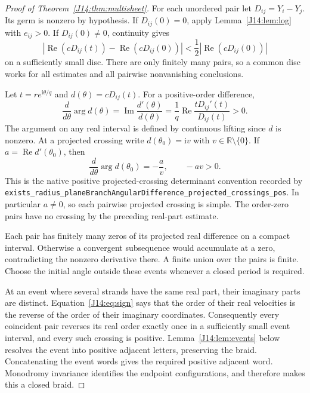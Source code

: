 \documentclass[11pt,oneside]{report}
\theoremstyle{definition}
\numberwithin{equation}{section}
\newcommand{\decl}[1]{\textnormal{\nolinkurl{#1}}}
\newcommand{\ii}{\mathrm i}
\newcommand{\Ree}{\operatorname{Re}}
\newcommand{\Imm}{\operatorname{Im}}
\begin{document}
\begin{proof}[Proof of Theorem~\ref{J14:thm:multisheet}]
For each unordered pair let $D_{ij}=Y_i-Y_j$. Its germ is nonzero by
hypothesis. If $D_{ij}(0)=0$, apply Lemma~\ref{J14:lem:log} with $e_{ij}>0$.
If $D_{ij}(0)\ne0$, continuity gives
\[
 \left|\Ree(cD_{ij}(t))-\Ree(cD_{ij}(0))\right|
 <\frac12\left|\Ree(cD_{ij}(0))\right|
\]
on a sufficiently small disc. There are only finitely many pairs, so a common
disc works for all estimates and all pairwise nonvanishing conclusions.

Let $t=r e^{\ii\theta/q}$ and $d(\theta)=cD_{ij}(t)$.
For a positive-order difference,
\begin{equation}\label{J14:eq:arg}
 \frac{d}{d\theta}\arg d(\theta)
 =\Imm\frac{d'(\theta)}{d(\theta)}
 =\frac1q\Ree\frac{tD_{ij}'(t)}{D_{ij}(t)}>0.
\end{equation}
The argument on any real interval is defined by continuous lifting since
$d$ is nonzero. At a projected crossing write $d(\theta_0)=\ii v$ with
$v\in\mathbb R\setminus\{0\}$. If $a=\Ree d'(\theta_0)$, then
\begin{equation}\label{J14:eq:sign}
 \frac{d}{d\theta}\arg d(\theta_0)=-\frac{a}{v},
 \qquad -a v>0.
\end{equation}
This is the native positive projected-crossing determinant convention
recorded by
\decl{exists_radius_planeBranchAngularDifference_projected_crossings_pos}.
In particular $a\ne0$, so each pairwise projected crossing is simple.
The order-zero pairs have no crossing by the preceding real-part estimate.

Each pair has finitely many zeros of its projected real difference on a
compact interval. Otherwise a convergent subsequence would accumulate at a
zero, contradicting the nonzero derivative there. A finite union over the
pairs is finite. Choose the initial angle outside these events whenever a
closed period is required.

At an event where several strands have the same real part, their imaginary
parts are distinct. Equation~\eqref{J14:eq:sign} says that the order of their
real velocities is the reverse of the order of their imaginary coordinates.
Consequently every coincident pair reverses its real order exactly once in
a sufficiently small event interval, and every such crossing is positive.
Lemma~\ref{J14:lem:events} below resolves the event into positive adjacent
letters, preserving the braid. Concatenating the event words gives the
required positive adjacent word. Monodromy invariance identifies the endpoint
configurations, and therefore makes this a closed braid.
\end{proof}
\end{document}
